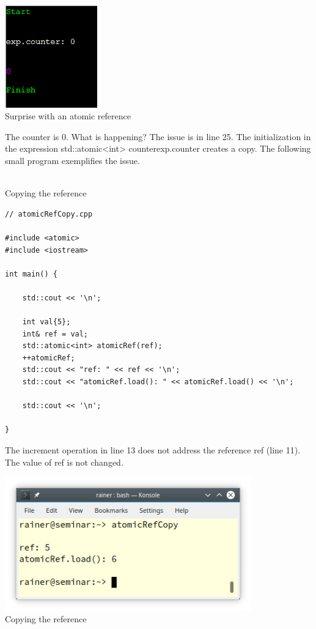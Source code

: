 \begin{center}
\includegraphics[width=0.3\textwidth]{content/3/chapter6/images/8.png}\\
Surprise with an atomic reference
\end{center}

The counter is 0. What is happening? The issue is in line 25. The initialization in the expression std::atomic<int> counter{exp.counter} creates a copy. The following small program exemplifies the issue.

\hspace*{\fill} \\ %
\noindent
Copying the reference
\begin{lstlisting}[style=styleCXX]
// atomicRefCopy.cpp

#include <atomic>
#include <iostream>

int main() {

	std::cout << '\n';
	
	int val{5};
	int& ref = val;
	std::atomic<int> atomicRef(ref);
	++atomicRef;
	std::cout << "ref: " << ref << '\n';
	std::cout << "atomicRef.load(): " << atomicRef.load() << '\n';
	
	std::cout << '\n';

}
\end{lstlisting}

The increment operation in line 13 does not address the reference ref (line 11). The value of ref is not changed.

\begin{center}
\includegraphics[width=0.8\textwidth]{content/3/chapter6/images/9.png}\\
Copying the reference
\end{center}

